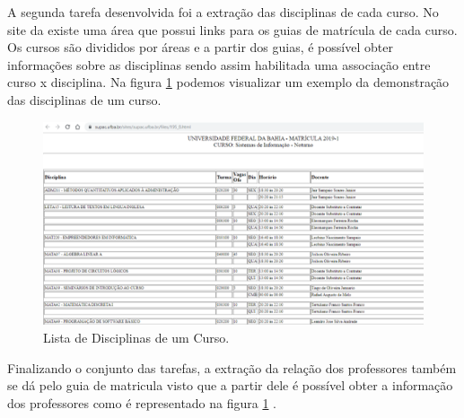 \documentclass[12pt, a4paper]{report}
\begin{document}
A segunda tarefa desenvolvida foi a extração das disciplinas de cada curso. No site da  existe uma área que possui links para os guias de matrícula de cada curso. Os cursos são divididos por áreas e a partir dos guias, é possível obter informações sobre as disciplinas sendo assim habilitada uma associação entre curso x disciplina. Na figura \ref{fig:disciplinas} podemos visualizar um exemplo da demonstração das disciplinas de um curso.

\begin{figure}[ht!]
\centering
\includegraphics[scale=0.8]{disciplinas.png}
\caption{Lista de Disciplinas de um Curso.}
\label{fig:disciplinas}
\end{figure}

Finalizando o conjunto das tarefas, a extração da relação dos professores também se dá pelo guia de matricula visto que a partir dele é possível obter a informação dos professores como é representado na figura \ref{fig:disciplinas} . 
\end{document}
